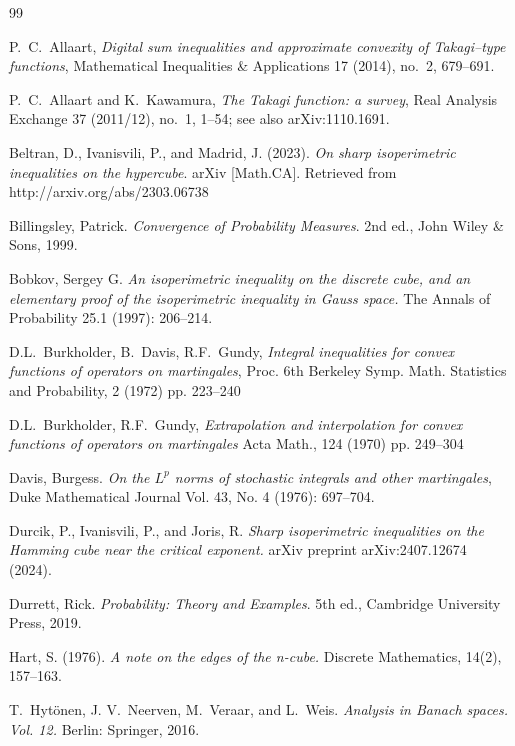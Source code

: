 \documentclass[11pt]{amsart}
\theoremstyle{definition}
\renewcommand{\1}{{\mathbbm{1}}}
\begin{document}
\begin{thebibliography}{99}

P.~C.~Allaart,
\textit{Digital sum inequalities and approximate convexity of Takagi--type functions},
Mathematical Inequalities \& Applications 17 (2014), no.~2, 679--691.

P.~C.~Allaart and K.~Kawamura,
\textit{The Takagi function: a survey},
Real Analysis Exchange 37 (2011/12), no.~1, 1--54;
see also arXiv:1110.1691.

Beltran, D., Ivanisvili, P., and Madrid, J. (2023).
\textit{On sharp isoperimetric inequalities on the hypercube}.
arXiv [Math.CA]. Retrieved from http://arxiv.org/abs/2303.06738

Billingsley, Patrick. \textit{Convergence of Probability Measures}. 2nd ed.,
John Wiley \& Sons, 1999.

Bobkov, Sergey G.
\textit{An isoperimetric inequality on the discrete cube, and an elementary proof of the isoperimetric inequality in Gauss space.}
The Annals of Probability 25.1 (1997): 206--214.

D.L.~Burkholder, B.~Davis, R.F.~Gundy, \textit{Integral inequalities for convex functions of operators on martingales},
Proc. 6th Berkeley Symp. Math. Statistics and Probability, 2 (1972) pp. 223--240

D.L.~Burkholder, R.F.~Gundy, \textit{Extrapolation and interpolation for convex functions of operators on martingales}
Acta Math., 124 (1970) pp. 249--304

Davis, Burgess. \textit{On the $L^{p}$ norms of stochastic integrals and other martingales},
Duke Mathematical Journal Vol. 43, No. 4 (1976): 697--704.

Durcik, P., Ivanisvili, P., and Joris, R.
\textit{Sharp isoperimetric inequalities on the Hamming cube near the critical exponent.}
arXiv preprint arXiv:2407.12674 (2024).

Durrett, Rick. \textit{Probability: Theory and Examples}. 5th ed.,
Cambridge University Press, 2019.

Hart, S. (1976).
\textit{A note on the edges of the n-cube.}
Discrete Mathematics, 14(2), 157--163.

T.~Hyt\"onen, J. V.~Neerven, M.~Veraar, and L.~Weis.
\textit{Analysis in Banach spaces. Vol. 12.} Berlin: Springer, 2016.


\end{thebibliography}
\end{document}
